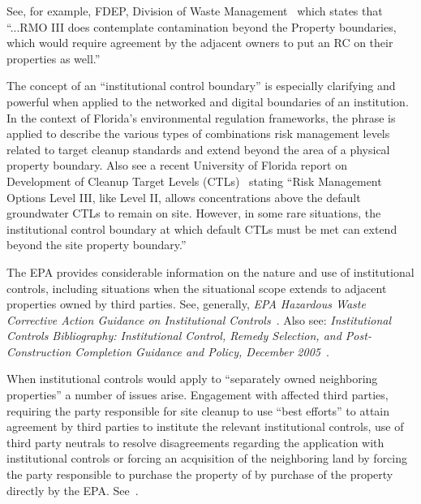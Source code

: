 See, for example, FDEP, Division of Waste Management~\cite{FloridaEPA2012} which states that
``...RMO III does contemplate contamination beyond the Property boundaries, which would require agreement by the adjacent owners to put an RC on their properties as well.''

The concept of an ``institutional control boundary'' is especially clarifying and powerful when applied to the networked and digital boundaries of an institution.
In the context of Florida's environmental regulation frameworks, the phrase is applied to describe the various types of combinations risk management levels related to target cleanup standards and extend beyond the area of a physical property boundary.
Also see a recent University of Florida report on Development of Cleanup Target Levels (CTLs)~\cite{UFlorida2005} stating
``Risk Management Options Level III, like Level II, allows concentrations above the default groundwater CTLs to remain on site.
However, in some rare situations, the institutional control boundary at which default CTLs must be met can extend beyond the site property boundary.''

The EPA provides considerable information on the nature and use of institutional controls, including situations when the situational scope extends to adjacent properties owned by third parties.
See, generally, {\em EPA Hazardous Waste Corrective Action Guidance on Institutional Controls}~\cite{EPA2007}.
Also see: {\em Institutional Controls Bibliography: Institutional Control, Remedy Selection, and Post-Construction Completion Guidance and Policy, December 2005}~\cite{EPAbibliography2005}.

When institutional controls would apply to ``separately owned neighboring properties'' a number of issues arise.
Engagement with affected third parties, requiring the party responsible for site cleanup to use ``best efforts''
to attain agreement by third parties to institute the relevant institutional controls, 
use of third party neutrals to resolve disagreements regarding the application with 
institutional controls or forcing an acquisition of the neighboring land by 
forcing the party responsible to purchase the property of by purchase of the property directly by the EPA.
See~\cite{EPA-540-R-09-001}.

